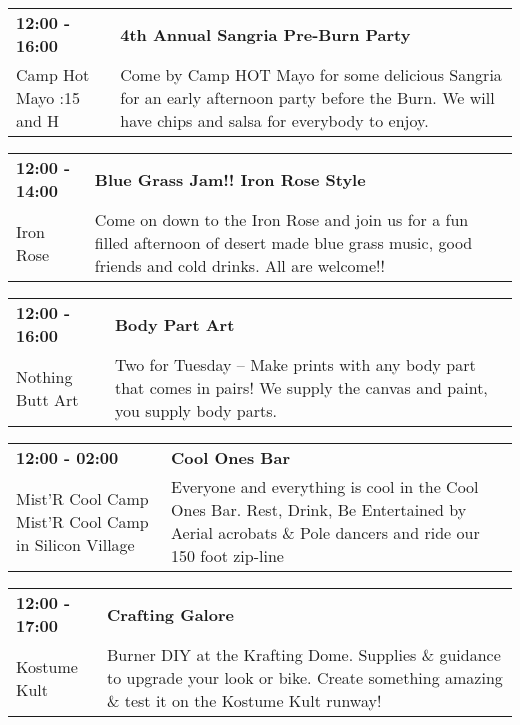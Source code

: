 \begin{tabular}{ p{1in} p{2.2in} }
    \textbf{12:00 - 16:00} & \textbf{4th Annual Sangria Pre-Burn Party} \\
    Camp Hot Mayo \newline 9:15 and H & Come by Camp HOT Mayo for some delicious Sangria for an early afternoon party before the Burn.  We will have chips and salsa for everybody to enjoy. \\
    \hline 
\end{tabular}
    
\begin{tabular}{ p{1in} p{2.2in} }
    \textbf{12:00 - 14:00} & \textbf{Blue Grass Jam!! Iron Rose Style} \\
    Iron Rose \newline  & Come on down to the Iron Rose and join us for a fun filled afternoon of desert made blue grass music, good friends and cold drinks.  All are welcome!! \\
    \hline 
\end{tabular}
    
\begin{tabular}{ p{1in} p{2.2in} }
    \textbf{12:00 - 16:00} & \textbf{Body Part Art} \\
    Nothing Butt Art \newline  & Two for Tuesday -- Make prints with any body part that comes in pairs! We supply the canvas and paint, you supply body parts. \\
    \hline 
\end{tabular}
    
\begin{tabular}{ p{1in} p{2.2in} }
    \textbf{12:00 - 02:00} & \textbf{Cool Ones Bar } \\
    Mist'R Cool Camp \newline Mist'R Cool Camp in Silicon Village & Everyone and everything is cool in the Cool Ones Bar. Rest, Drink, Be Entertained by Aerial acrobats \& Pole dancers and ride our 150 foot zip-line \\
    \hline 
\end{tabular}
    
\begin{tabular}{ p{1in} p{2.2in} }
    \textbf{12:00 - 17:00} & \textbf{Crafting Galore} \\
    Kostume Kult \newline  & Burner DIY at the Krafting Dome. Supplies \& guidance to upgrade your look or bike. Create something amazing \& test it on the Kostume Kult runway! \\
    \hline 
\end{tabular}
    
